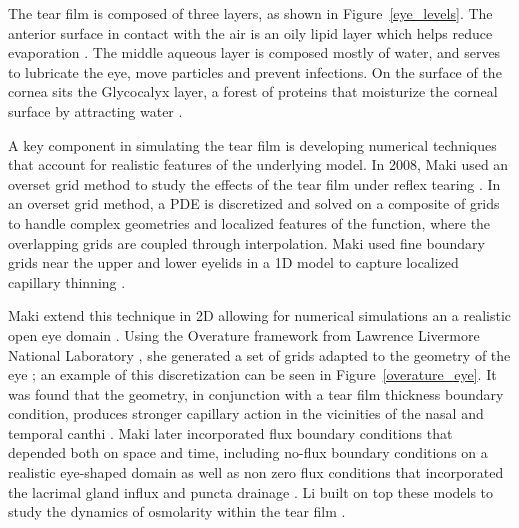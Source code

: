 	The tear film is composed of three layers, as shown in Figure~\ref{eye_levels}. The anterior surface in contact with the air is an oily lipid layer which helps reduce evaporation \cite{norn1979semiquantitative,mishima1961oily}. The middle aqueous layer is composed mostly of water, and serves to lubricate the eye, move particles and prevent infections. On the surface of the cornea sits the Glycocalyx layer, a forest of proteins that moisturize the corneal surface by attracting water \cite{gipson2004distribution}. 
	
	A key component in simulating the tear film is developing numerical techniques that account for realistic features of the underlying model. In 2008, Maki used an \textrm{overset grid} method to study the effects of the tear film under reflex tearing \cite{maki2008overset}. In an overset grid method, a PDE is discretized and solved on a composite of grids to handle complex geometries and localized features of the function, where the overlapping grids are coupled through interpolation. Maki used fine boundary grids near the upper and lower eyelids in a 1D model to capture localized capillary thinning \cite{maki2008overset}.
	
	Maki extend this technique in 2D allowing for numerical simulations an a realistic open eye domain \cite{maki2010tear,maki2010tear2}. Using the Overature framework from Lawrence Livermore National Laboratory \cite{chesshire1990composite,henshaw1998ogen}, she generated a set of grids adapted to the geometry of the eye \cite{chesshire1990composite}; an example of this discretization can be seen in Figure~\ref{overature_eye}. It was found that the geometry, in conjunction with a tear film thickness boundary condition, produces stronger capillary action in the vicinities of the nasal and temporal canthi \cite{maki2010tear}. Maki later incorporated flux boundary conditions that depended both on space and time, including no-flux boundary conditions on a realistic eye-shaped domain as well as non zero flux conditions that incorporated the lacrimal gland influx and puncta drainage \cite{maki2010tear2}. Li built on top these models to study the dynamics of osmolarity within the tear film \cite{li2012model,li2015computed}.
	
